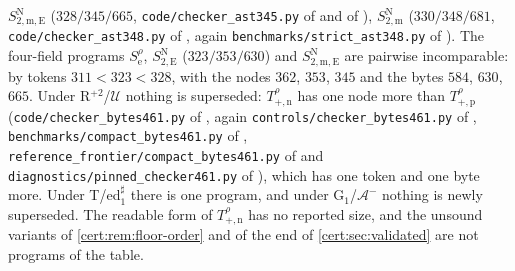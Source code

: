 $S^{\mathrm N}_{2,\mathrm{m,E}}$ ($328/345/665$, \texttt{code/checker\_ast345.py} of
 and of ),
$S^{\mathrm N}_{2,\mathrm m}$ ($330/348/681$, \texttt{code/checker\_ast348.py} of
, again \texttt{benchmarks/strict\_ast348.py} of
). The four-field programs $S^{\rho}_{\mathrm e}$,
$S^{\mathrm N}_{2,\mathrm E}$ ($323/353/630$) and $S^{\mathrm N}_{2,\mathrm{m,E}}$ are
pairwise incomparable: by tokens $311<323<328$, with the nodes $362$, $353$, $345$ and
the bytes $584$, $630$, $665$. Under R$^{+2}$/$\mathcal U$ nothing is superseded:
$T^{\rho}_{+,\mathrm n}$ has one node more than $T^{\rho}_{+,\mathrm p}$
(\texttt{code/checker\_bytes461.py} of , again
\texttt{controls/checker\_bytes461.py} of ,
\texttt{benchmarks/compact\_bytes461.py} of ,
\texttt{reference\_frontier/compact\_bytes461.py} of
 and \texttt{diagnostics/pinned\_checker461.py} of
), which has one token and one byte more. Under T/ed$_1^{\sharp}$ there
is one program, and under G$_1$/$\mathcal A^{-}$ nothing is newly superseded. The
readable form of $T^{\rho}_{+,\mathrm n}$ has no reported size, and the unsound
variants of \cref{cert:rem:floor-order} and of the end of \cref{cert:sec:validated}
are not programs of the table.

